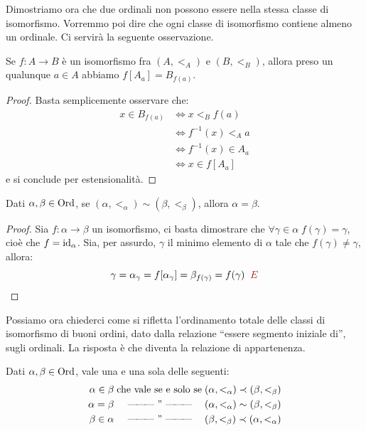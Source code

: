 Dimostriamo ora che due ordinali non possono essere nella stessa classe di
isomorfismo.
Vorremmo poi dire che ogni classe di isomorfismo contiene almeno un
ordinale.
Ci servir\`a la seguente osservazione.

\begin{remark}
	Se $f\colon A \to B$ \`e un isomorfismo fra $(A,<_A)$ e $(B,<_B)$, allora preso un qualunque $a \in A$ abbiamo $f[A_a] = B_{f(a)}$.
\end{remark}

\begin{proof}
	Basta semplicemente osservare che:
	\[\begin{split}
		x \in B_{f(a)} &\iff x <_B f(a) \\
					   &\iff f^{-1}(x) <_A a \\
					   &\iff f^{-1}(x) \in A_a \\
					   &\iff x \in f[A_a]
	\end{split}
		\]
	e si conclude per estensionalit\`a.
\end{proof}

\begin{proposition}\label{ord-iso-equ}
	Dati $\alpha,\beta \in \operatorname{Ord}$, se $(\alpha,<_\alpha) \sim (\beta,<_\beta)$, allora $\alpha = \beta$.
\end{proposition}

\begin{proof}
	Sia $f \colon \alpha \to \beta$ un isomorfismo, ci basta
dimostrare che $\forall {\gamma \in \alpha} \; f(\gamma) = \gamma$, cio\`e che $f = \operatorname{id}_\alpha$. Sia, per assurdo,
	$\gamma$ il minimo elemento di $\alpha$ tale che $f(\gamma) \ne \gamma$, allora:
	\[ \gamma = \alpha_\gamma = f[\alpha_\gamma] = \beta_{f(\gamma)} =
f(\gamma)\;\;{\drkred\lightning}
		\]
\end{proof}

Possiamo ora chiederci come si rifletta l'ordinamento totale delle classi di isomorfismo di buoni ordini, dato dalla relazione 
``essere segmento iniziale di'', sugli ordinali. La risposta \`e che diventa la relazione di appartenenza.

\begin{theorem}
	Dati $\alpha,\beta \in\operatorname{Ord}$, vale {\drkred una e una sola} delle seguenti:
	\begin{align*}
		\alpha \in \beta \;\text{che vale se e solo se}\; & (\alpha,<_\alpha) \prec (\beta,<_\beta) \\
		\alpha = \beta \;\phantom{\text{che vale se e solo
se}}\mathllap{\text{---\!---\!--- '' ---\!---\!---}\quad}\; & (\alpha,<_\alpha) \sim (\beta,<_\beta) \\
		\beta \in \alpha \;\phantom{\text{che vale se e solo se}}\mathllap{\text{---\!---\!--- '' ---\!---\!---}\quad}\; & (\beta,<_\beta) \prec (\alpha,<_\alpha)
	\end{align*}
\end{theorem}

